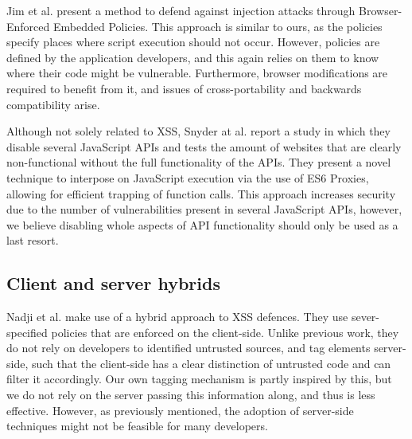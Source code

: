 Jim et al. \cite{Jim:2007:DSI:1242572.1242654} present a method to defend against injection attacks through Browser-Enforced Embedded Policies. This approach is similar to ours, as the policies specify places where script execution should not occur. However, policies are defined by the application developers, and this again relies on them to know where their code might be vulnerable. Furthermore, browser modifications are required to benefit from it, and issues of cross-portability and backwards compatibility arise.

Although not solely related to XSS, Snyder at al. \cite{Snyder:2017:MWD:3133956.3133966} report a study in which they disable several JavaScript APIs and tests the amount of websites that are clearly non-functional without the full functionality of the APIs. They present a novel technique to interpose on JavaScript execution via the use of ES6 Proxies, allowing for efficient trapping of function calls. This approach increases security due to the number of vulnerabilities present in several JavaScript APIs, however, we believe disabling whole aspects of API functionality should only be used as a last resort.

\subsection{Client and server hybrids}
Nadji et al. \cite{Nadji:2009} make use of a hybrid approach to XSS defences. They use sever-specified policies that are enforced on the client-side. Unlike previous work, they do not rely on developers to identified untrusted sources, and tag elements server-side, such that the client-side has a clear distinction of untrusted code and can filter it accordingly. Our own tagging mechanism is partly inspired by this, but we do not rely on the server passing this information along, and thus is less effective. However, as previously mentioned, the adoption of server-side techniques might not be feasible for many developers.